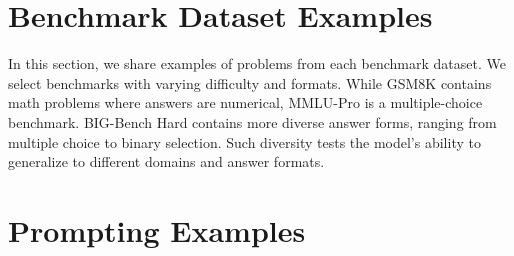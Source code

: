 \section{Benchmark Dataset Examples}
In this section, we share examples of problems from each benchmark dataset. We select benchmarks with varying difficulty and formats. While GSM8K contains math problems where answers are numerical, MMLU-Pro is a multiple-choice benchmark. BIG-Bench Hard contains more diverse answer forms, ranging from multiple choice to binary selection. Such diversity tests the model's ability to generalize to different domains and answer formats. 


\section{Prompting Examples}

